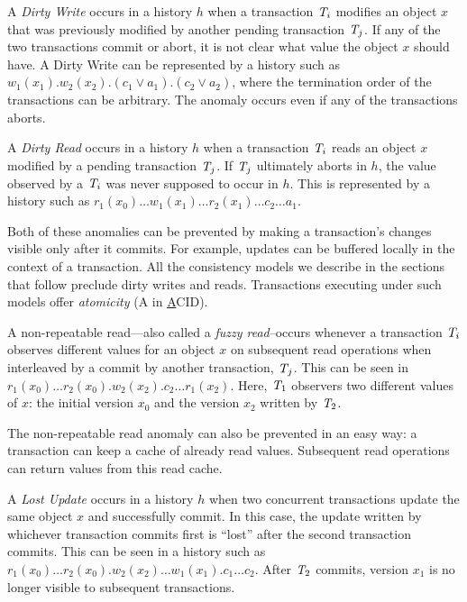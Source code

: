 \begin{definition}
A \emph{Dirty Write} occurs in a history $h$ when a transaction $\mathit{T}_i$ modifies an object $x$ that was previously modified by another pending transaction $\mathit{T}_j$. If any of the two transactions commit or abort, it is not clear what value the object $x$ should have. A Dirty Write can be represented by a history such as $w_1(x_1).w_2(x_2).(c_1 \vee a_1).(c_2 \vee a_2)$, where the termination order of the transactions can be arbitrary. The anomaly occurs even if any of the transactions aborts.
\end{definition}

\begin{definition}
A \emph{Dirty Read} occurs in a history $h$ when a transaction $\mathit{T}_i$ reads an object $x$ modified by a pending transaction $\mathit{T}_j$. If $\mathit{T}_j$ ultimately aborts in $h$, the value observed by a $\mathit{T}_i$ was never supposed to occur in $h$. This is represented by a history such as $r_1(x_0)\ldots w_1(x_1)\ldots r_2(x_1)\ldots c_2\ldots a_1$.
\end{definition}

Both of these anomalies can be prevented by making a transaction's changes visible only after it commits. For example, updates can be buffered locally in the context of a transaction. All the consistency models we describe in the sections that follow preclude dirty writes and reads. Transactions executing under such models offer \emph{atomicity} (A in \underline{A}CID).

\begin{definition}
A non-repeatable read---also called a \emph{fuzzy read}--occurs whenever a transaction $\mathit{T}_i$ observes different values for an object $x$ on subsequent read operations when interleaved by a commit by another transaction, $\mathit{T}_j$. This can be seen in $r_1(x_0)\ldots r_2(x_0).w_2(x_2).c_2 \ldots r_1(x_2)$. Here, $\mathit{T}_1$ observers two different values of $x$: the initial version $x_0$ and the version $x_2$ written by $\mathit{T}_2$.
\end{definition}

The non-repeatable read anomaly can also be prevented in an easy way: a transaction can keep a cache of already read values. Subsequent read operations can return values from this read cache.

\begin{definition}
A \emph{Lost Update} occurs in a history $h$ when two concurrent transactions update the same object $x$ and successfully commit. In this case, the update written by whichever transaction commits first is ``lost'' after the second transaction commits. This can be seen in a history such as $r_1(x_0)\ldots r_2(x_0).w_2(x_2) \ldots w_1(x_1).c_1\ldots c_2$. After $\mathit{T}_2$ commits, version $x_1$ is no longer visible to subsequent transactions.
\end{definition}

